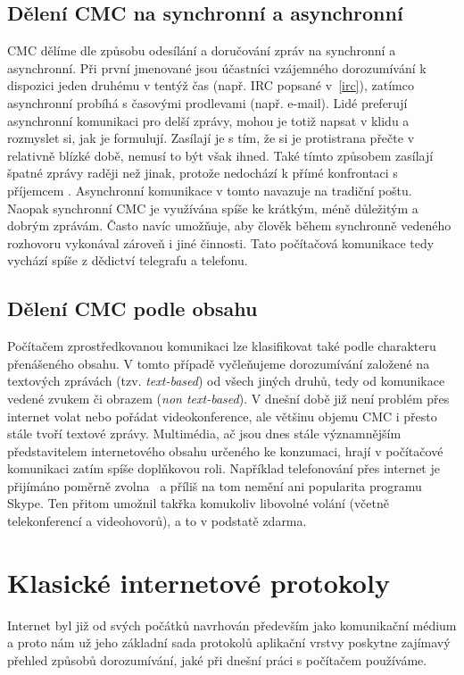 \documentclass[12pt,oneside,final]{fithesis2}
\begin{document}
\subsection{Dělení CMC na synchronní a asynchronní}
CMC dělíme dle způsobu odesílání a doručování zpráv na synchronní a asynchronní. Při první jmenované jsou účastníci vzájemného dorozumívání k dispozici jeden druhému v tentýž čas (např. IRC popsané v~\ref{irc}), zatímco asynchronní probíhá s časovými prodlevami (např. e-mail). Lidé preferují asynchronní komunikaci pro delší zprávy, mohou je totiž napsat v klidu a rozmyslet si, jak je formulují. Zasílají je s tím, že si je protistrana přečte v relativně blízké době, nemusí to být však ihned. Také tímto způsobem zasílají špatné zprávy raději než jinak, protože nedochází k přímé konfrontaci s příjemcem \cite{joszova2009trendy}. Asynchronní komunikace v tomto navazuje na tradiční poštu. Naopak synchronní CMC je využívána spíše ke krátkým, méně důležitým a dobrým zprávám. Často navíc umožňuje, aby člověk během synchronně vedeného rozhovoru vykonával zároveň i jiné činnosti. Tato počítačová komunikace tedy vychází spíše z dědictví telegrafu a telefonu.

\subsection{Dělení CMC podle obsahu}
Počítačem zprostředkovanou komunikaci lze klasifikovat také podle charakteru přenášeného obsahu. V tomto případě vyčleňujeme dorozumívání založené na textových zprávách (tzv. \emph{text-based}) od všech jiných druhů, tedy od komunikace vedené zvukem či obrazem (\emph{non text-based}). V dnešní době již není problém přes internet volat nebo pořádat videokonference, ale většinu objemu CMC i přesto stále tvoří textové zprávy. Multimédia, ač jsou dnes stále významnějším představitelem internetového obsahu určeného ke konzumaci, hrají v počítačové komunikaci zatím spíše doplňkovou roli. Například telefonování přes internet je přijímáno poměrně zvolna~\cite{latif2007adoption} a příliš na tom nemění ani popularita programu Skype. Ten přitom umožnil takřka komukoliv libovolné volání (včetně telekonferencí a videohovorů), a to v podstatě zdarma.


\section{Klasické internetové protokoly}\label{protocols}
Internet byl již od svých počátků navrhován především jako komunikační médium a proto nám už jeho základní sada protokolů aplikační vrstvy poskytne zajímavý přehled způsobů dorozumívání, jaké při dnešní práci s počítačem používáme.
\end{document}
